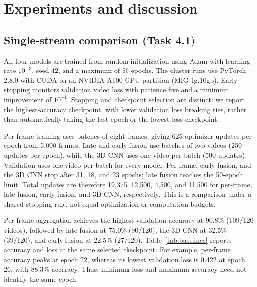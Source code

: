 \section{Experiments and discussion}
\label{sec:experiments}

\subsection{Single-stream comparison (Task 4.1)}
All four models are trained from random initialization using Adam with
learning rate $10^{-3}$, seed 42, and a maximum of 50 epochs. The cluster
runs use PyTorch 2.8.0 with CUDA on an NVIDIA A100 GPU partition
(MIG 1g.10gb). Early stopping monitors validation video loss with patience
five and a minimum improvement of $10^{-4}$. Stopping and checkpoint
selection are distinct: we report the highest-accuracy checkpoint, with
lower validation loss breaking ties, rather than automatically taking the
last epoch or the lowest-loss checkpoint.

Per-frame training uses batches of eight frames, giving 625 optimizer
updates per epoch from 5,000 frames. Late and early fusion use batches of
two videos (250 updates per epoch), while the 3D CNN uses one video per
batch (500 updates). Validation uses one video per batch for every model.
Per-frame, early fusion, and the 3D CNN stop after 31, 18, and 23 epochs;
late fusion reaches the 50-epoch limit. Total updates are therefore 19,375,
12,500, 4,500, and 11,500 for per-frame, late fusion, early fusion, and 3D
CNN, respectively. This is a comparison under a shared stopping rule,
not equal optimization or computation budgets.



Per-frame aggregation achieves the highest validation accuracy at 90.8\%
(109/120 videos), followed by late fusion at 75.0\% (90/120), the 3D CNN
at 32.5\% (39/120), and early fusion at 22.5\% (27/120).
Table~\ref{tab:baselines} reports accuracy and loss at the same selected
checkpoint. For example, per-frame accuracy peaks at epoch 22, whereas its
lowest validation loss is 0.422 at epoch 26, with 88.3\% accuracy. Thus,
minimum loss and maximum accuracy need not identify the same epoch.

